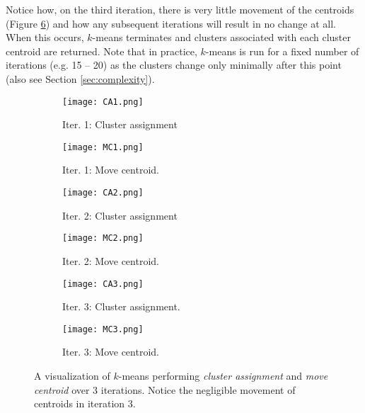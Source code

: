Notice how, on the third iteration, there is very little movement of the centroids (Figure \ref{fig:k-means-loop-3-mc}) and how any subsequent iterations will result in no change at all. When this occurs, $k$-means terminates and clusters associated with each cluster centroid are returned. Note that in practice, $k$-means is run for a fixed number of iterations (e.g. 15 -- 20) as the clusters change only minimally after this point (also see Section \ref{sec:complexity}). 

\begin{figure}
     \centering
     \begin{subfigure}[b]{0.48\textwidth}
         \centering
         \texttt{[image: CA1.png]}
         \caption{Iter. 1: Cluster assignment}
         \label{fig:k-means-loop-1-ca}
     \end{subfigure}
     \hfill
     \begin{subfigure}[b]{0.48\textwidth}
         \centering
         \texttt{[image: MC1.png]}
         \caption{Iter. 1: Move centroid.}
         \label{fig:k-means-loop-1-mc}
     \end{subfigure}
     \hfill
     \begin{subfigure}[b]{0.48\textwidth}
         \centering
         \texttt{[image: CA2.png]}
         \caption{Iter. 2: Cluster assignment}
         \label{fig:k-means-loop-2-ca}
     \end{subfigure}
     \hfill
     \begin{subfigure}[b]{0.48\textwidth}
         \centering
         \texttt{[image: MC2.png]}
         \caption{Iter. 2: Move centroid.}
         \label{fig:k-means-loop-2-mc}
     \end{subfigure}
     \hfill
     \begin{subfigure}[b]{0.48\textwidth}
         \centering
         \texttt{[image: CA3.png]}
         \caption{Iter. 3: Cluster assignment.}
         \label{fig:k-means-loop-3-ca}
     \end{subfigure}
     \hfill
     \begin{subfigure}[b]{0.48\textwidth}
         \centering
         \texttt{[image: MC3.png]}
         \caption{Iter. 3: Move centroid.}
         \label{fig:k-means-loop-3-mc}
     \end{subfigure}
        \caption{A visualization of $k$-means performing \emph{cluster assignment} and \emph{move centroid} over 3 iterations. Notice the negligible movement of centroids in iteration 3.}
        \label{fig:k-means-loop}
\end{figure}

